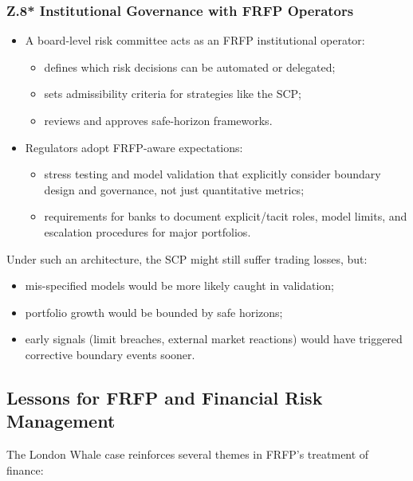\subsubsection*{Z.8* Institutional Governance with FRFP Operators}

\begin{itemize}
  \item A board-level risk committee acts as an FRFP institutional operator:
        \begin{itemize}
          \item defines which risk decisions can be automated or delegated;
          \item sets admissibility criteria for strategies like the SCP;
          \item reviews and approves safe-horizon frameworks.
        \end{itemize}
  \item Regulators adopt FRFP-aware expectations:
        \begin{itemize}
          \item stress testing and model validation that explicitly consider
                boundary design and governance, not just quantitative metrics;
          \item requirements for banks to document explicit/tacit roles,
                model limits, and escalation procedures for major portfolios.
        \end{itemize}
\end{itemize}

Under such an architecture, the SCP might still suffer trading losses, but:

\begin{itemize}
  \item mis-specified models would be more likely caught in validation;
  \item portfolio growth would be bounded by safe horizons;
  \item early signals (limit breaches, external market reactions) would have
        triggered corrective boundary events sooner.
\end{itemize}

\subsection{Lessons for FRFP and Financial Risk Management}

The London Whale case reinforces several themes in FRFP’s treatment of
finance:


